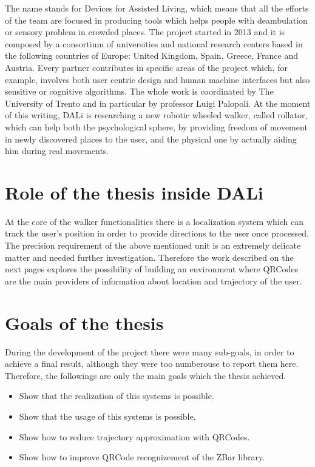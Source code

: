 The name stands for Devices for Assisted Living, which means that all the efforts of the team are focused in producing tools which helps people with deambulation or sensory problem in crowded places.
The project started in 2013 and it is composed by a consortium of universities and national research centers based in the following countries of Europe: United Kingdom, Spain, Greece, France and Austria.
Every partner contributes in specific areas of the project which, for example, involves both user centric design and human machine interfaces but also sensitive or cognitive algorithms.
The whole work is coordinated by The University of Trento and in particular by professor Luigi Palopoli.
At the moment of this writing, DALi is researching a new robotic wheeled walker, called rollator, which can help both the psychological sphere, by providing freedom of movement in newly discovered places to the user, and the physical one by actually aiding him during real movements.


\section{Role of the thesis inside DALi}
At the core of the walker functionalities there is a localization system which can track the user's position in order to provide directions to the user once processed.
The precision requirement of the above mentioned unit is an extremely delicate matter and needed further investigation.
Therefore the work described on the next pages explores the possibility of building an environment where QRCodes are the main providers of information about location and trajectory of the user.

\section{Goals of the thesis}
During the development of the project there were many sub-goals, in order to achieve a final result, although they were too numberouse to report them here.
Therefore, the followings are only the main goals which the thesis achieved.
\begin{itemize}
	\item Show that the realization of this systems is possible.
	\item Show that the usage of this systems is possible.
	\item Show how to reduce trajectory approximation with QRCodes.
	\item Show how to improve QRCode recognizement of the ZBar library.
\end{itemize}


